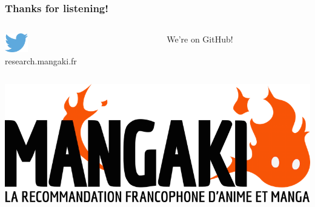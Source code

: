 \documentclass[handout]{beamer}
\begin{document}
\begin{frame}
	\frametitle{Thanks for listening!}
  \LARGE
	\begin{columns}
	\begin{column}{0.5\textwidth}
  \includegraphics[width=1cm]{figures/twitter.png}\,\,\\[1mm]
  research.mangaki.fr
	\end{column}
	\begin{column}{0.5\textwidth}
	\centering
  \huge We're on GitHub!
  \end{column}
  \end{columns}
  \vspace{5mm}
  \includegraphics[width=\linewidth]{figures/mangaki.png}
\end{frame}


\end{document}
